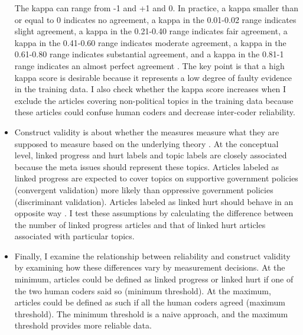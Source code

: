\documentclass[12 pt]{article}
\begin{document}
\begin{itemize}
   The kappa can range from -1 and +1 and 0. In practice, a kappa smaller than or equal to 0 indicates no agreement, a kappa in the 0.01-0.02 range indicates slight agreement, a kappa in the 0.21-0.40 range indicates fair agreement, a kappa in the 0.41-0.60 range indicates moderate agreement, a kappa in the 0.61-0.80 range indicates substantial agreement, and a kappa in the 0.81-1 range indicates an almost perfect agreement \citep[279]{mchugh2012interrater}. The key point is that a high kappa score is desirable because it represents a low degree of faulty evidence in the training data. I also check whether the kappa score increases when I exclude the articles covering non-political topics in the training data because these articles could confuse human coders and decrease inter-coder reliability.
    \item Construct validity is about whether the measures measure what they are supposed to measure based on the underlying theory \citep{cronbach1955construct}. At the conceptual level, linked progress and hurt labels and topic labels are closely associated because the meta issues should represent these topics. Articles labeled as linked progress are expected to cover topics on supportive government policies (convergent validation) more likely than oppressive government policies (discriminant validation). Articles labeled as linked hurt should behave in an opposite way \citep{campbell1959convergent}. I test these assumptions by calculating the difference between the number of linked progress articles and that of linked hurt articles associated with particular topics. 
    \item Finally, I examine the relationship between reliability and construct validity by examining how these differences vary by measurement decisions. At the minimum, articles could be defined as linked progress or linked hurt if one of the two human coders said so (minimum threshold). At the maximum, articles could be defined as such if all the human coders agreed (maximum threshold). The minimum threshold is a naive approach, and the maximum threshold provides more reliable data.
\end{itemize}
\end{document}
